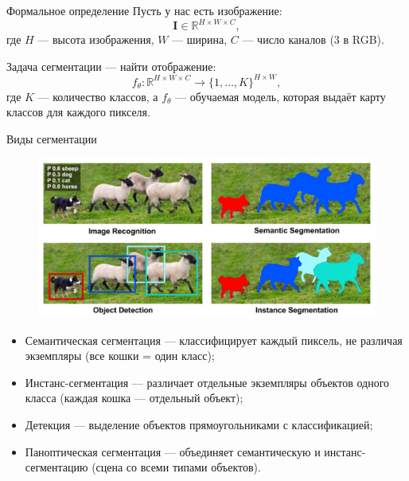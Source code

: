 \documentclass[notheorems, handout]{beamer}
\begin{document}
\begin{frame}{Формальное определение}
    Пусть у нас есть изображение:
    \[
        \mathbf{I} \in \mathbb{R} ^{H \times W \times C},
    \]
    где $H$ --- высота изображения, $W$ --- ширина, $C$ --- число каналов ($3$ в RGB).

    Задача сегментации --- найти отображение:
    \[
        f _\theta: \mathbb{R} ^{H \times W \times C} \to \{1, \dots, K\} ^{H \times W},
    \]
    где $K$ --- количество классов, а $f _\theta$ --- обучаемая модель, которая выдаёт карту классов для каждого пикселя.
\end{frame}

\begin{frame}{Виды сегментации}
    \begin{figure}
        \includegraphics[width=0.75\linewidth]{img/segmentation_kind.png}        
    \end{figure}
    \small
    \begin{itemize}
        \item Семантическая сегментация --- классифицирует каждый пиксель, не различая экземпляры (все кошки = один класс);
        \item Инстанс-сегментация --- различает отдельные экземпляры объектов одного класса (каждая кошка — отдельный объект);
        \item Детекция --- выделение объектов прямоугольниками с классификацией;
        \item Паноптическая сегментация --- объединяет семантическую и инстанс-сегментацию (сцена со всеми типами объектов).
    \end{itemize}
\end{frame}
\end{document}
